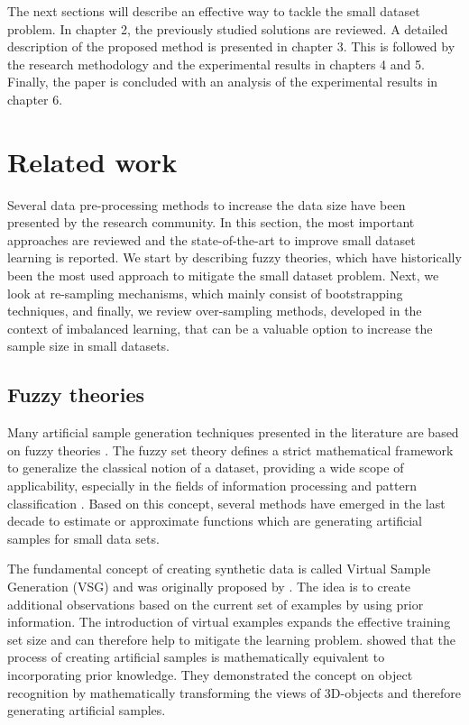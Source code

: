 \documentclass[parskip=full]{scrartcl}
\begin{document}
The next sections will describe an effective way to tackle the small dataset
problem. In chapter 2, the previously studied solutions are reviewed. A detailed
description of the proposed method is presented in chapter 3. This is followed
by the research methodology and the experimental results in chapters 4 and 5.
Finally, the paper is concluded with an analysis of the experimental results in
chapter 6.

\section{Related work}

Several data pre-processing methods to increase the data size have been
presented by the research community. In this section, the most important
approaches are reviewed and the state-of-the-art to improve small dataset
learning is reported. We start by describing fuzzy theories, which have
historically been the most used approach to mitigate the small dataset problem.
Next, we look at re-sampling mechanisms, which mainly consist of bootstrapping
techniques, and finally, we review over-sampling methods, developed in the
context of imbalanced learning, that can be a valuable option to increase the
sample size in small datasets.

\subsection{Fuzzy theories}

Many artificial sample generation techniques presented in the literature are
based on fuzzy theories \cite{AbdulLateh.2017}. The fuzzy set theory defines a
strict mathematical framework to generalize the classical notion of a dataset,
providing a wide scope of applicability, especially in the fields of information
processing and pattern classification \cite{Zimmermann.2010}. Based on this
concept, several methods have emerged in the last decade to estimate or
approximate functions which are generating artificial samples for small data
sets.

The fundamental concept of creating synthetic data is called Virtual Sample
Generation (VSG) and was originally proposed by \cite{Niyogi.1998}. The idea is
to create additional observations based on the current set of examples by using
prior information. The introduction of virtual examples expands the effective
training set size and can therefore help to mitigate the learning problem.
\cite{Niyogi.1998} showed that the process of creating artificial samples is
mathematically equivalent to incorporating prior knowledge. They demonstrated
the concept on object recognition by mathematically transforming the views of
3D-objects and therefore generating artificial samples.
\end{document}
